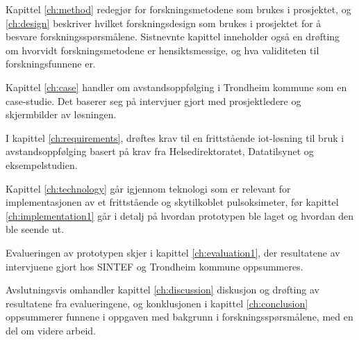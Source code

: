 Kapittel \ref{ch:method} redegjør for forskningsmetodene som brukes i prosjektet, og \ref{ch:design} beskriver hvilket forskningsdesign som brukes i prosjektet for å besvare forskningsspørsmålene.
Sistnevnte kapittel inneholder også en drøfting om hvorvidt forskningsmetodene er hensiktsmessige, og hva validiteten til forskningsfunnene er.

Kapittel \ref{ch:case} handler om avstandsoppfølging i Trondheim kommune som en case-studie. Det baserer seg på intervjuer gjort med
prosjektledere og skjermbilder av løsningen.

I kapittel \ref{ch:requirements}, drøftes krav til en frittstående \gls{iot}-løsning til bruk i avstandsoppfølging basert på krav fra Helsedirektoratet,
Datatilsynet og eksempelstudien.

Kapittel \ref{ch:technology} går igjennom teknologi som er relevant for implementasjonen av et frittstående og skytilkoblet pulsoksimeter,
før kapittel \ref{ch:implementation1} går i detalj på hvordan prototypen ble laget og hvordan den ble seende ut.

Evalueringen av prototypen skjer i kapittel \ref{ch:evaluation1}, der resultatene av intervjuene gjort hos SINTEF og Trondheim kommune oppsummeres.

Avslutningsvis omhandler kapittel \ref{ch:discussion} diskusjon og drøfting av resultatene fra evalueringene, og konklusjonen i kapittel \ref{ch:conclusion}
oppsummerer funnene i oppgaven med bakgrunn i forskningsspørsmålene, med en del om videre arbeid.
